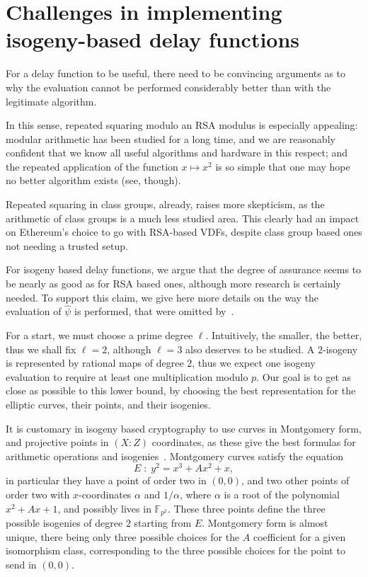 \documentclass{llncs}
\newcommand{\F}{\mathbb{F}}
\begin{document}
\section{Challenges in implementing isogeny-based delay functions}
\label{sec:secure-impl-isog}

For a delay function to be useful, there need to be convincing
arguments as to why the evaluation cannot be performed considerably
better than with the legitimate algorithm.

In this sense, repeated squaring modulo an RSA modulus is especially
appealing: modular arithmetic has been studied for a long time, and we
are reasonably confident that we know all useful algorithms and
hardware in this respect; and the repeated application of the function
$x\mapsto x^2$ is so simple that one may hope no better algorithm
exists (see\cite{BernsteinSorenson07}, though).

Repeated squaring in class groups, already, raises more skepticism, as
the arithmetic of class groups is a much less studied area. %
This clearly had an impact on Ethereum's choice to go with RSA-based
VDFs, despite class group based ones not needing a trusted setup.

For isogeny based delay functions, we argue that the degree of
assurance seems to be nearly as good as for RSA based ones, although
more research is certainly needed. %
To support this claim, we give here more details on the way the
evaluation of $\hat\psi$ is performed, that were omitted
by~\cite{10.1007/978-3-030-34578-5_10}.

For a start, we must choose a prime degree $\ell$. %
Intuitively, the smaller, the better, thus we shall fix $\ell=2$,
although $\ell=3$ also deserves to be studied. %
A $2$-isogeny is represented by rational maps of degree $2$, thus we
expect one isogeny evaluation to require at least one multiplication
modulo $p$. %
Our goal is to get as close as possible to this lower bound, by
choosing the best representation for the elliptic curves, their
points, and their isogenies.

It is customary in isogeny based cryptography to use curves in
Montgomery form, and projective points in $(X:Z)$ coordinates, as
these give the best formulas for arithmetic operations and
isogenies~\cite{costello2016sidh,10.1007/978-3-319-79063-3_11}. %
Montgomery curves satisfy the equation
\[E \;:\; y^2 = x^3 + Ax^2 + x,\] %
in particular they have a point of order two in $(0,0)$, and two other
points of order two with $x$-coordinates $\alpha$ and $1/\alpha$,
where $\alpha$ is a root of the polynomial $x^2+Ax+1$, and possibly
lives in $\F_{p^2}$. %
These three points define the three possible isogenies of degree $2$
starting from $E$. %
Montgomery form is almost unique, there being only three possible
choices for the $A$ coefficient for a given isomorphism class,
corresponding to the three possible choices for the point to send in
$(0,0)$.
\end{document}
